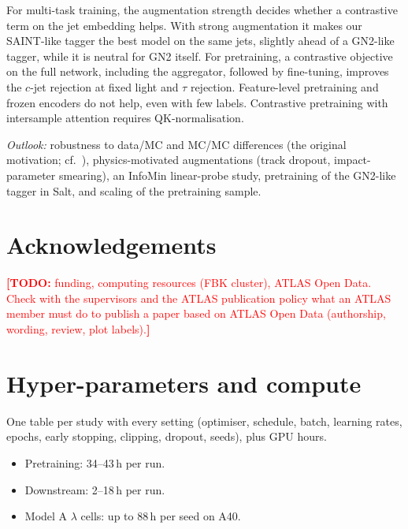 \documentclass[11pt,a4paper]{article}
\newcommand{\todo}[1]{\textcolor{red}{\textbf{[TODO:} #1\textbf{]}}}
\begin{document}
For multi-task training, the augmentation strength decides whether a contrastive term on
the jet embedding helps. With strong augmentation it makes our SAINT-like tagger the best
model on the same jets, slightly ahead of a GN2-like tagger, while it is neutral for GN2
itself. For pretraining, a contrastive objective on the full network, including the
aggregator, followed by fine-tuning, improves the $c$-jet rejection at fixed light and
$\tau$ rejection. Feature-level pretraining and frozen encoders do not help, even with few
labels. Contrastive pretraining with intersample attention requires QK-normalisation.

\emph{Outlook:} robustness to data/MC and MC/MC differences (the original motivation; cf.\
\citep{Sheldon2025MACK,Harris2025Resim}), physics-motivated augmentations (track dropout,
impact-parameter smearing), an InfoMin linear-probe study, pretraining of the GN2-like
tagger in Salt, and scaling of the pretraining sample.

\section*{Acknowledgements}
\todo{funding, computing resources (FBK cluster), ATLAS Open Data. Check with the
supervisors and the ATLAS publication policy what an ATLAS member must do to publish a
paper based on ATLAS Open Data (authorship, wording, review, plot labels).}

\appendix

\section{Hyper-parameters and compute}
\label{app:hyper}
One table per study with every setting (optimiser, schedule, batch, learning rates,
epochs, early stopping, clipping, dropout, seeds), plus GPU hours.
\begin{itemize}
  \item Pretraining: 34--43\,h per run.
  \item Downstream: 2--18\,h per run.
  \item Model A $\lambda$ cells: up to 88\,h per seed on A40.
\end{itemize}
\end{document}
